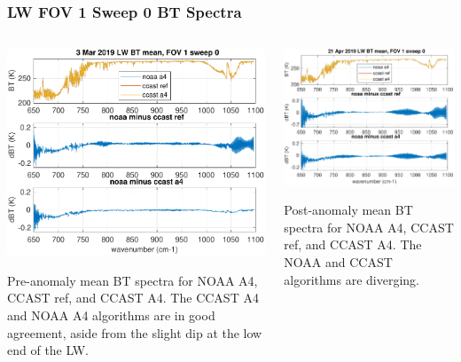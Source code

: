 \documentclass[10pt]{beamer}
\begin{document}
\begin{frame}
\frametitle{LW FOV 1 Sweep 0 BT Spectra}
\begin{columns}[t]
\begin{column}{0.5\textwidth}
  \begin{centering}
  \includegraphics[width=\textwidth]{figures/LW_MW_good_BT_fov1_sd0.pdf}
  \end{centering}\vspace{3mm}
  Pre-anomaly mean BT spectra for NOAA A4, CCAST ref, and CCAST A4.
  The CCAST A4 and NOAA A4 algorithms are in good agreement, aside
  from the slight dip at the low end of the LW.

\end{column}
\begin{column}{0.5\textwidth}  
  \begin{centering}
  \includegraphics[width=\textwidth]{figures/LW_MW_fail_BT_fov1_sd0.pdf}
  \end{centering}\vspace{3mm}
  Post-anomaly mean BT spectra for NOAA A4, CCAST ref, and CCAST A4.
  The NOAA and CCAST algorithms are diverging.

\end{column}
\end{columns}
\end{frame}
\end{document}
